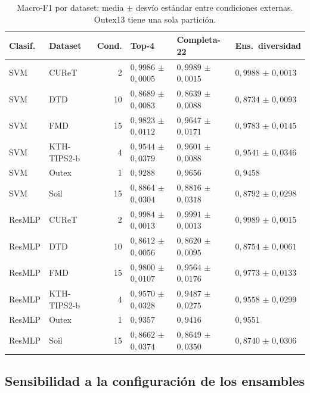 \documentclass[11pt,a4paper]{article}
\begin{document}
\begin{table}[H]
\centering\fontsize{8}{10}\selectfont\setlength{\tabcolsep}{3.0pt}
\caption{Macro-F1 por dataset: media $\pm$ desvío estándar entre condiciones externas. Outex13 tiene una sola partición.}
\label{tab:sel-spread}
\begin{tabular}{@{}llrlll@{}}
\toprule
Clasif. & Dataset & Cond. & Top-4 & Completa-22 & Ens.\ diversidad \\
\midrule
SVM & CUReT & 2 & $0{,}9986$ $\pm$ $0{,}0005$ & $0{,}9989$ $\pm$ $0{,}0015$ & $0{,}9988$ $\pm$ $0{,}0013$ \\
SVM & DTD & 10 & $0{,}8689$ $\pm$ $0{,}0083$ & $0{,}8639$ $\pm$ $0{,}0088$ & $0{,}8734$ $\pm$ $0{,}0093$ \\
SVM & FMD & 15 & $0{,}9823$ $\pm$ $0{,}0112$ & $0{,}9647$ $\pm$ $0{,}0171$ & $0{,}9783$ $\pm$ $0{,}0145$ \\
SVM & KTH-TIPS2-b & 4 & $0{,}9544$ $\pm$ $0{,}0379$ & $0{,}9601$ $\pm$ $0{,}0088$ & $0{,}9541$ $\pm$ $0{,}0346$ \\
SVM & Outex & 1 & $0{,}9288$ & $0{,}9656$ & $0{,}9458$ \\
SVM & Soil & 15 & $0{,}8864$ $\pm$ $0{,}0304$ & $0{,}8816$ $\pm$ $0{,}0318$ & $0{,}8792$ $\pm$ $0{,}0298$ \\
ResMLP & CUReT & 2 & $0{,}9984$ $\pm$ $0{,}0013$ & $0{,}9991$ $\pm$ $0{,}0013$ & $0{,}9989$ $\pm$ $0{,}0015$ \\
ResMLP & DTD & 10 & $0{,}8612$ $\pm$ $0{,}0056$ & $0{,}8620$ $\pm$ $0{,}0095$ & $0{,}8754$ $\pm$ $0{,}0061$ \\
ResMLP & FMD & 15 & $0{,}9800$ $\pm$ $0{,}0107$ & $0{,}9564$ $\pm$ $0{,}0176$ & $0{,}9773$ $\pm$ $0{,}0133$ \\
ResMLP & KTH-TIPS2-b & 4 & $0{,}9570$ $\pm$ $0{,}0328$ & $0{,}9487$ $\pm$ $0{,}0275$ & $0{,}9558$ $\pm$ $0{,}0299$ \\
ResMLP & Outex & 1 & $0{,}9357$ & $0{,}9416$ & $0{,}9551$ \\
ResMLP & Soil & 15 & $0{,}8662$ $\pm$ $0{,}0374$ & $0{,}8649$ $\pm$ $0{,}0350$ & $0{,}8740$ $\pm$ $0{,}0306$ \\
\bottomrule
\end{tabular}
\end{table}

\subsection{Sensibilidad a la configuración de los ensambles}
\end{document}

